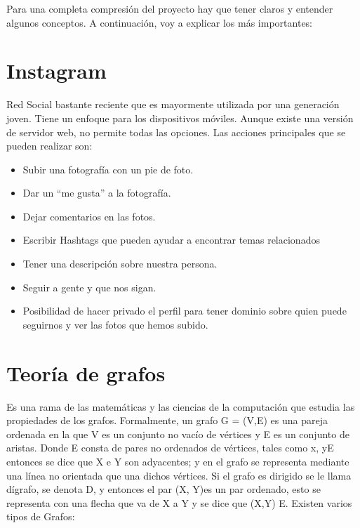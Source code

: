 
Para una completa compresión del proyecto hay que tener claros y entender algunos conceptos. A continuación, voy a explicar los más importantes:

\section{Instagram}

Red Social bastante reciente que es mayormente utilizada por una generación joven.
Tiene un enfoque para los dispositivos móviles. Aunque existe una versión de servidor web, no permite todas las opciones. Las acciones principales que se pueden realizar son:
\begin{itemize}
    \item Subir una fotografía con un pie de foto.
    \item Dar un “me gusta” a la fotografía.
    \item Dejar comentarios en las fotos.
    \item Escribir Hashtags que pueden ayudar a encontrar temas relacionados
\end{itemize}
    
\begin{itemize}

    \item Tener una descripción sobre nuestra persona.
    \item Seguir a gente y que nos sigan.
    \item Posibilidad de hacer privado el perfil para tener dominio sobre quien puede seguirnos y ver las fotos que hemos subido.
    
\end{itemize}
 
\section{Teoría de grafos} 
Es una rama de las matemáticas y las ciencias de la computación que estudia las propiedades de los grafos.
Formalmente, un grafo G = (V,E) es una pareja ordenada en la que V es un conjunto no vacío de vértices y E es un conjunto de aristas. Donde E consta de pares no ordenados de vértices, tales como {x, y}E entonces se dice que X e Y son adyacentes; y en el grafo se representa mediante una línea no orientada que una dichos vértices. Si el grafo es dirigido se le llama dígrafo, se denota D, y entonces el par (X, Y)es un par ordenado, esto se representa con una flecha que va de X a Y y se dice que (X,Y) E.
Existen varios tipos de Grafos: \cite{wiki:caracterizacion}

